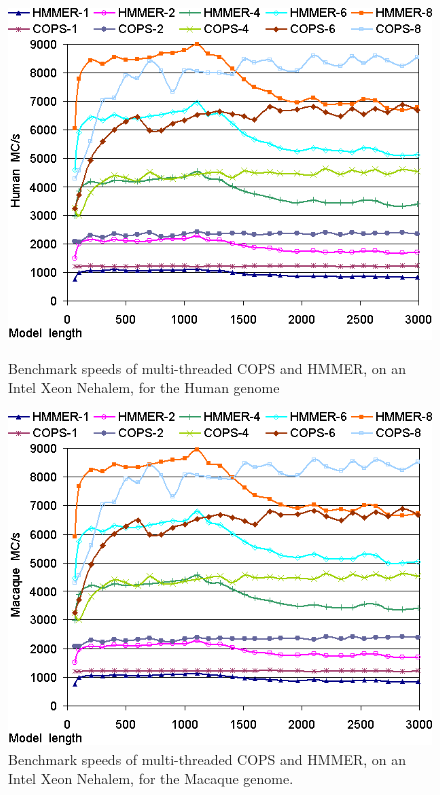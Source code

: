 \clearpage


\begin{figure}[h!]
    \begin{minipage}{0.48\linewidth}
		\centering
		\includegraphics[scale=0.46]{graphics/threads-tags-runtimes-human.png}
		\caption[Speeds of the multi-threaded COPS and HMMER, Intel Xeon, Human] 
		{Benchmark speeds of multi-threaded COPS and HMMER, on an Intel Xeon Nehalem, for the Human genome}
		\label{threads-tags-runtimes-human}
    \end{minipage}
    \hspace{0.04\linewidth}
    \begin{minipage}{0.48\linewidth}
		\centering
		\includegraphics[scale=0.46]{graphics/threads-tags-runtimes-macaque.png}
		\caption[Speeds of the multi-threaded COPS and HMMER, Intel Xeon, Macaque] 
		{Benchmark speeds of multi-threaded COPS and HMMER, on an Intel Xeon Nehalem, for the Macaque genome.}
		\label{threads-tags-runtimes-macaque}
    \end{minipage}
\end{figure} 

